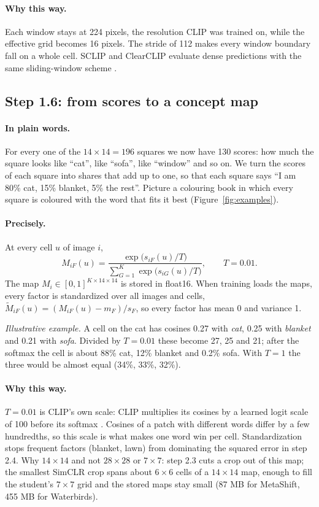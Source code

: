\documentclass[11pt]{article}
\newcommand{\plain}{\paragraph{In plain words.}}
\newcommand{\precise}{\paragraph{Precisely.}}
\newcommand{\why}{\paragraph{Why this way.}}
\begin{document}
\why Each window stays at 224 pixels, the resolution CLIP was trained on, while the effective grid becomes 16
pixels. The stride of 112 makes every window boundary fall on a whole cell. SCLIP and ClearCLIP evaluate dense
predictions with the same sliding-window scheme \citep{wang2024sclip,lan2024clearclip}.

\subsection{Step 1.6: from scores to a concept map}
\plain For every one of the $14\times14=196$ squares we now have 130 scores: how much the square looks like
``cat'', like ``sofa'', like ``window'' and so on. We turn the scores of each square into shares that add up to
one, so that each square says ``I am 80\% cat, 15\% blanket, 5\% the rest''. Picture a colouring book in which
every square is coloured with the word that fits it best (Figure~\ref{fig:examples}).

\precise At every cell $u$ of image $i$,
\begin{equation}
M_{iF}(u)=\frac{\exp\big(s_{iF}(u)/T\big)}{\sum_{G=1}^{K}\exp\big(s_{iG}(u)/T\big)},\qquad T=0.01 .
\end{equation}
The map $M_i\in[0,1]^{K\times14\times14}$ is stored in float16. When training loads the maps, every factor is
standardized over all images and cells, $\tilde M_{iF}(u)=(M_{iF}(u)-m_F)/s_F$, so every factor has mean 0 and
variance 1.

\textit{Illustrative example.} A cell on the cat has cosines 0.27 with \emph{cat}, 0.25 with \emph{blanket} and 0.21
with \emph{sofa}. Divided by $T=0.01$ these become 27, 25 and 21; after the softmax the cell is about 88\% cat,
12\% blanket and 0.2\% sofa. With $T=1$ the three would be almost equal (34\%, 33\%, 32\%).

\why $T=0.01$ is CLIP's own scale: CLIP multiplies its cosines by a learned logit scale of 100 before its
softmax \citep{radford2021clip}. Cosines of a patch with different words differ by a few hundredths, so this scale
is what makes one word win per cell. Standardization stops frequent factors (blanket, lawn) from dominating the
squared error in step 2.4. Why $14\times14$ and not $28\times28$ or $7\times7$: step 2.3 cuts a crop out of this
map; the smallest SimCLR crop spans about $6\times6$ cells of a $14\times14$ map, enough to fill the student's
$7\times7$ grid and the stored maps stay small (87 MB for MetaShift, 455 MB for Waterbirds).
\end{document}
